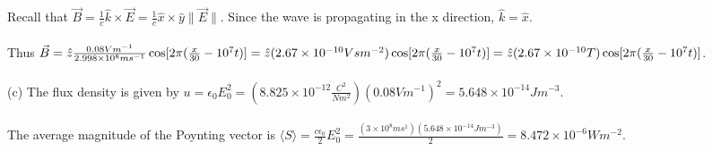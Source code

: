 \documentclass[12pt]{article}
\begin{document}
\noindent Recall that $\vec{B} = \frac{1}{c}\hat{k} \times \vec{E} 
=\frac{1}{c}\hat{x}\times\hat{y}\| \vec{E} \|$. Since the wave is 
propagating in the x direction, $\hat{k} = \hat{x}$. \\\\Thus
$\vec{B} = \hat{z}\frac{0.08Vm^{-1}}{2.998\times 10^{8}ms^{-1}}
\cos[2\pi(\frac{x}{30}-10^{7}t)] 
\\\\= \hat{z}(2.67\times10^{-10}Vsm^{-2})\cos[2\pi(\frac{x}{30}-10^{7}t)]
\\\\=\hat{z}(2.67\times10^{-10}T)\cos[2\pi(\frac{x}{30}-10^{7}t)]$.\\\\

\noindent (c) The flux density is given by $u = \epsilon_{0}E_{0}^{2}
=(8.825\times10^{-12}\frac{C^{2}}{Nm^{2}})(0.08Vm^{-1})^{2} = 5.648\times10^{-14}Jm^{-3}$.\\\\
\noindent The average magnitude of the Poynting vector is $\langle S \rangle = \frac{c\epsilon_{0}}{2}E_{0}^{2} = \frac{(3\times10^{8}ms^{1})(5.648\times10^{-14}Jm^{-3})}{2} = 8.472\times10^{-6}Wm^{-2}$.
\end{document}
